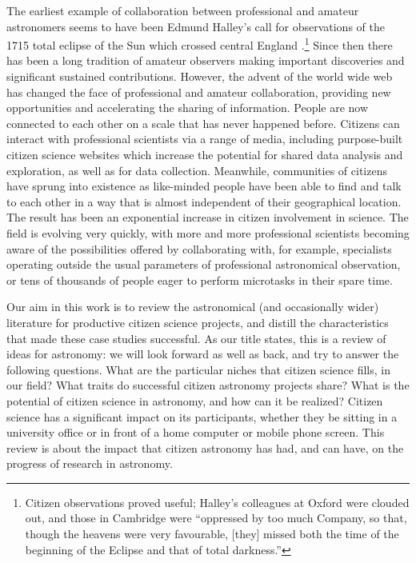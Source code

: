 \documentclass{ar2e}
\begin{document}
The earliest
example of collaboration between professional and amateur astronomers seems to
have been Edmund Halley's call for observations of the 1715 total eclipse of the
Sun which crossed central England \citep{Halley}.\footnote{Citizen observations proved useful; Halley's colleagues at
Oxford were clouded out, and those in Cambridge were ``oppressed by too much
Company, so that, though the heavens were very favourable, [they] missed both
the time of the beginning of the Eclipse and that of total darkness.''}  Since
then there has been a long tradition of amateur observers
making important discoveries and significant sustained contributions. However,
the advent of the world wide web has changed the face of professional and
amateur collaboration, providing new opportunities and accelerating the sharing
of information. People are now connected to each other on a scale that has never
happened before. Citizens can interact with professional scientists via a range
of media, including purpose-built citizen science websites which
increase the potential for shared data analysis and exploration, as well as for
data collection. Meanwhile, communities of citizens have sprung into existence
as like-minded people have been able to find and talk to each other in a way
that is almost independent of their geographical location. The result has been
an exponential increase in citizen involvement in science. The field is evolving
very quickly, with more and more professional scientists becoming aware of the
possibilities offered by collaborating with, for example, specialists operating
outside the usual parameters of professional astronomical observation, or tens
of thousands of people eager to perform microtasks in their spare time.  

Our aim in this work is to review the astronomical (and occasionally wider)
literature for productive citizen science projects, and distill the
characteristics that made these case studies successful.  As our title states,
this is a review of ideas for astronomy: we will look forward as well as back,
and try to answer the following questions. What are the particular niches that
citizen science fills, in our field? What traits do successful citizen astronomy
projects share? What is the potential of citizen science in
astronomy, and how can it be realized?  Citizen science has a significant impact
on its participants,  whether they be sitting in a university office or in front
of a home computer or mobile phone screen. This review is about the impact that
citizen astronomy has had, and can have, on the progress of  research in
astronomy.
\end{document}
